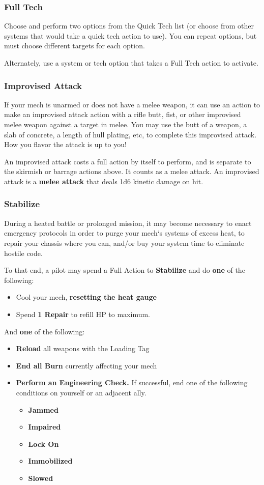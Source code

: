 \subsubsection{Full Tech}
Choose and perform two options from the Quick Tech list (or choose from other systems that would take a quick tech action to use). You can repeat options, but must choose different targets for each option.

Alternately, use a system or tech option that takes a Full Tech action to activate.

\subsubsection{Improvised Attack}

If your mech is unarmed or does not have a melee weapon, it can use an action to make an improvised attack action with a rifle butt, fist, or other improvised melee weapon against a target in melee. You may use the butt of a weapon, a slab of concrete, a length of hull plating, etc, to complete this improvised attack. How you flavor the attack is up to you!

An improvised attack costs a full action by itself to perform, and is separate to the skirmish or barrage actions above. It counts as a melee attack. An improvised attack is a \textbf{melee attack} that deals 1d6 kinetic damage on hit.

\subsubsection{Stabilize}
During a heated battle or prolonged mission, it may become necessary to enact emergency protocols in order to purge your mech‘s systems of excess heat, to repair your chassis where you can, and/or buy your system time to eliminate hostile code.

To that end, a pilot may spend a Full Action to \textbf{Stabilize} and do \textbf{one} of the following:
\begin{itemize}
    \item Cool your mech, \textbf{resetting the heat gauge}
    \item Spend \textbf{1 Repair} to refill HP to maximum.
\end{itemize}
And \textbf{one} of the following:
\begin{itemize}
    \item \textbf{Reload} all weapons with the Loading Tag
    \item \textbf{End all Burn} currently affecting your mech
    \item \textbf{Perform an Engineering Check.} If successful, end one of the following conditions on yourself or an adjacent ally.
    \begin{itemize}
        \item \textbf{Jammed}
        \item \textbf{Impaired}
        \item \textbf{Lock On}
        \item \textbf{Immobilized}
        \item \textbf{Slowed}
    \end{itemize}
\end{itemize}

